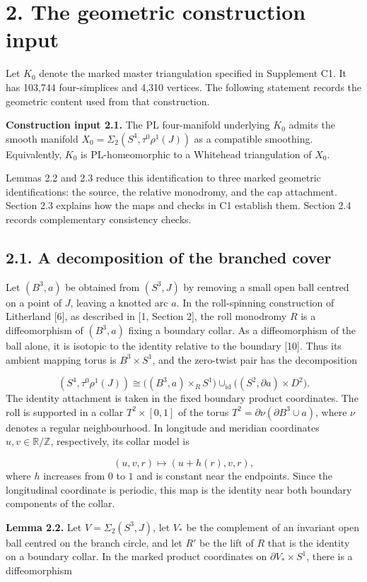 \documentclass[11pt,letterpaper]{article}
\begin{document}
\section*{2. The geometric construction input}
Let $K_0$ denote the marked master triangulation specified in Supplement C1. It has 103,744 four-simplices and 4,310 vertices. The following statement records the geometric content used from that construction.

\medskip\noindent\textbf{Construction input 2.1.} The PL four-manifold underlying $K_0$ admits the smooth manifold $X_0=\Sigma_2(S^4,\tau^0\rho^1(J))$ as a compatible smoothing. Equivalently, $K_0$ is PL-homeomorphic to a Whitehead triangulation of $X_0$.

Lemmas 2.2 and 2.3 reduce this identification to three marked geometric identifications: the source, the relative monodromy, and the cap attachment. Section 2.3 explains how the maps and checks in C1 establish them. Section 2.4 records complementary consistency checks.

\subsection*{2.1. A decomposition of the branched cover}
Let $(B^3,a)$ be obtained from $(S^3,J)$ by removing a small open ball centred on a point of $J$, leaving a knotted arc $a$. In the roll-spinning construction of Litherland [6], as described in [1, Section 2], the roll monodromy $R$ is a diffeomorphism of $(B^3,a)$ fixing a boundary collar. As a diffeomorphism of the ball alone, it is isotopic to the identity relative to the boundary [10]. Thus its ambient mapping torus is $B^3\times S^1$, and the zero-twist pair has the decomposition

\[
(S^4,\tau^0\rho^1(J))\cong\bigl((B^3,a)\times_R S^1\bigr)\cup_{\mathrm{id}}\bigl((S^2,\partial a)\times D^2\bigr).
\]
The identity attachment is taken in the fixed boundary product coordinates. The roll is supported in a collar $T^2\times[0,1]$ of the torus $T^2=\partial\nu(\partial B^3\cup a)$, where $\nu$ denotes a regular neighbourhood. In longitude and meridian coordinates $u,v\in\mathbb{R}/\mathbb{Z}$, respectively, its collar model is

\[
(u,v,r)\longmapsto(u+h(r),v,r),
\]
where $h$ increases from $0$ to $1$ and is constant near the endpoints. Since the longitudinal coordinate is periodic, this map is the identity near both boundary components of the collar.

\medskip\noindent\textbf{Lemma 2.2.} Let $V=\Sigma_2(S^3,J)$, let $V_*$ be the complement of an invariant open ball centred on the branch circle, and let $R'$ be the lift of $R$ that is the identity on a boundary collar. In the marked product coordinates on $\partial V_*\times S^1$, there is a diffeomorphism
\end{document}
